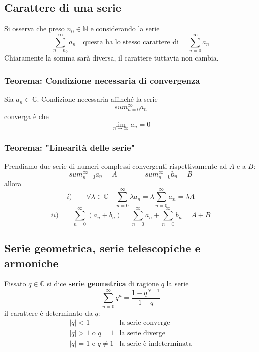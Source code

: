 \documentclass[x11names]{article}
\begin{document}
	
	\subsection{Carattere di una serie}
	Si osserva che preso \(n_{0} \in \mathbb{N}\) e considerando la serie
	\[ 
	\sum_{n=n_{0}}^{\infty} a_{n} \quad \text{questa ha lo stesso carattere di }\quad \sum_{n=0}^{\infty} a_{n}
	\]
	Chiaramente la somma sarà diversa, il carattere tuttavia non cambia.
	\begin{center}
		\colorbox{myred}{\begin{minipage}{5.75in}
				\begin{redes}{}
					\subsubsection{Teorema: Condizione necessaria di convergenza}
					Sia \(a_{n} \subset \mathbb{C}\). Condizione necessaria affinché la serie
					\[ 
					sum_{n=0}^{\infty} a_{n}
					\]
					converga è che 
					\[ 
					\lim_{n\to \infty} a_{n} = 0
					\]
				\end{redes}
		\end{minipage}}        
	\end{center}
	
	\begin{center}
		\colorbox{myred}{\begin{minipage}{5.75in}
				\begin{redes}{}
					\subsubsection{Teorema: "Linearità delle serie"}
					Prendiamo due serie di numeri complessi convergenti rispettivamente ad \(A\) e a \(B\):
					\[ 
					sum_{n=0}^{\infty} a_{n} = A \qquad\qquad sum_{n=0}^{\infty} b_{n} = B
					\]
					allora
					\[ 
					i) \qquad \forall \lambda \in \mathbb{C} \quad  \sum_{n=0}^{\infty} \lambda a_{n} = \lambda \sum_{n=0}^{\infty}  a_{n}= \lambda A
					\]
					\[ 
					ii) \qquad \sum_{n=0}^{\infty}  (a_{n} + b_{n} )= \sum_{n=0}^{\infty} a_{n} + \sum_{n=0}^{\infty} b_{n} = A + B
					\]
				\end{redes}
		\end{minipage}}        
	\end{center}
	
	\subsection{Serie geometrica, serie telescopiche e armoniche}
	Fissato \(q \in \mathbb{C}\) si dice \textbf{serie geometrica} di ragione \(q\) la serie
	\[ 
	\sum_{n=0}^{\infty} q^n = \frac{1-q^{N+1}}{1-q}
	\]
	il carattere è determinato da \(q\):
	\[ 
	\begin{array}{lc}
		|q| < 1 & \text{la serie converge} \\
		|q| > 1 \text{ o } q = 1 & \text{la serie diverge} \\
		|q| = 1 \text{ e } q \neq 1 & \text{la serie è indeterminata} \\
	\end{array}
	\] \\
	
\end{document}
